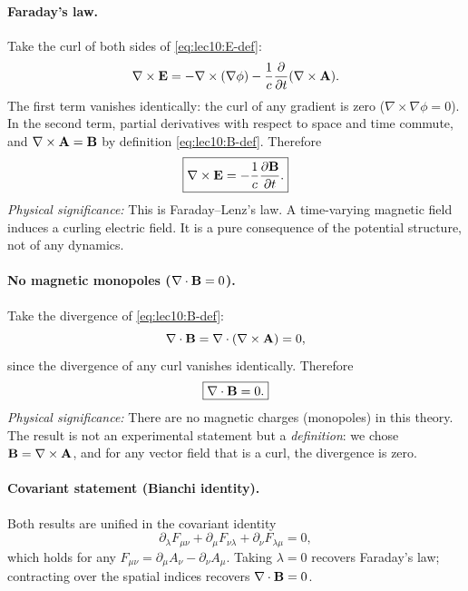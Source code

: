 \paragraph{Faraday's law.}
Take the curl of both sides of \eqref{eq:lec10:E-def}:
\begin{equation}\label{eq:lec10:faraday-start}
  \nabla\times\mathbf{E}
  =
  -\nabla\times(\nabla\phi)
  -\frac{1}{c}\frac{\partial}{\partial t}(\nabla\times\mathbf{A}).
\end{equation}
The first term vanishes identically: the curl of any gradient is zero ($\nabla\times\nabla\phi=0$).
In the second term, partial derivatives with respect to space and time commute, and
$\nabla\times\mathbf{A}=\mathbf{B}$ by definition \eqref{eq:lec10:B-def}.  Therefore
\begin{equation}\label{eq:lec10:faraday}
  \boxed{
  \nabla\times\mathbf{E} = -\frac{1}{c}\frac{\partial\mathbf{B}}{\partial t}.
  }
\end{equation}
\textit{Physical significance:} This is Faraday--Lenz's law.  A time-varying magnetic field induces
a curling electric field.  It is a pure consequence of the potential structure, not of any dynamics.

\paragraph{No magnetic monopoles ($\nabla\cdot\mathbf{B}=0$).}
Take the divergence of \eqref{eq:lec10:B-def}:
\begin{equation}\label{eq:lec10:divB-calc}
  \nabla\cdot\mathbf{B}
  =
  \nabla\cdot(\nabla\times\mathbf{A}) = 0,
\end{equation}
since the divergence of any curl vanishes identically.  Therefore
\begin{equation}\label{eq:lec10:divB}
  \boxed{
  \nabla\cdot\mathbf{B} = 0 .
  }
\end{equation}
\textit{Physical significance:} There are no magnetic charges (monopoles) in this theory.  The result
is not an experimental statement but a \emph{definition}: we chose $\mathbf{B}=\nabla\times\mathbf{A}$, and for
any vector field that is a curl, the divergence is zero.

\paragraph{Covariant statement (Bianchi identity).}
Both results are unified in the covariant identity
\begin{equation}\label{eq:lec10:bianchi}
  \partial_\lambda F_{\mu\nu}
  +\partial_\mu F_{\nu\lambda}
  +\partial_\nu F_{\lambda\mu}
  = 0 ,
\end{equation}
which holds for any $F_{\mu\nu}=\partial_\mu A_\nu-\partial_\nu A_\mu$.  Taking $\lambda=0$ recovers
Faraday's law; contracting over the spatial indices recovers $\nabla\cdot\mathbf{B}=0$.

